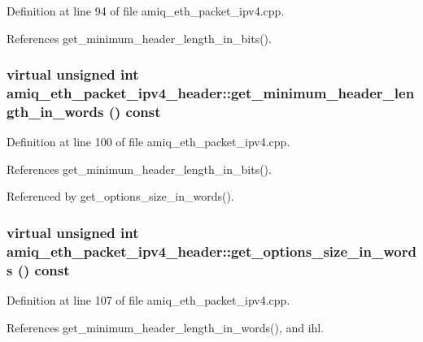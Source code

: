 Definition at line 94 of file amiq\_\-eth\_\-packet\_\-ipv4.cpp.

References get\_\-minimum\_\-header\_\-length\_\-in\_\-bits().\hypertarget{classamiq__eth__packet__ipv4__header_a2f853ab62e598a7e7ea8240ba959430f}{
\subsubsection[{get\_\-minimum\_\-header\_\-length\_\-in\_\-words}]{\setlength{\rightskip}{0pt plus 5cm}virtual unsigned int amiq\_\-eth\_\-packet\_\-ipv4\_\-header::get\_\-minimum\_\-header\_\-length\_\-in\_\-words () const}}
\label{classamiq__eth__packet__ipv4__header_a2f853ab62e598a7e7ea8240ba959430f}


Definition at line 100 of file amiq\_\-eth\_\-packet\_\-ipv4.cpp.

References get\_\-minimum\_\-header\_\-length\_\-in\_\-bits().

Referenced by get\_\-options\_\-size\_\-in\_\-words().\hypertarget{classamiq__eth__packet__ipv4__header_aef70a380caba7a48db3391ebc7e89637}{
\subsubsection[{get\_\-options\_\-size\_\-in\_\-words}]{\setlength{\rightskip}{0pt plus 5cm}virtual unsigned int amiq\_\-eth\_\-packet\_\-ipv4\_\-header::get\_\-options\_\-size\_\-in\_\-words () const}}
\label{classamiq__eth__packet__ipv4__header_aef70a380caba7a48db3391ebc7e89637}


Definition at line 107 of file amiq\_\-eth\_\-packet\_\-ipv4.cpp.

References get\_\-minimum\_\-header\_\-length\_\-in\_\-words(), and ihl.

